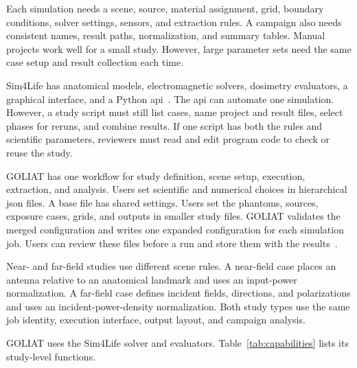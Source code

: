 \documentclass[final,5p,times,twocolumn]{elsarticle}
\begin{document}
Each simulation needs a scene, source, material assignment, grid, boundary conditions, solver settings, sensors, and extraction rules. A campaign also needs consistent names, result paths, normalization, and summary tables. Manual projects work well for a small study. However, large parameter sets need the same case setup and result collection each time.

Sim4Life has anatomical models, electromagnetic solvers, dosimetry evaluators, a graphical interface, and a Python \gls{api}~\cite{Gosselin2014,Sim4Life}. The \gls{api} can automate one simulation. However, a study script must still list cases, name project and result files, select phases for reruns, and combine results. If one script has both the rules and scientific parameters, reviewers must read and edit program code to check or reuse the study.

GOLIAT has one workflow for study definition, scene setup, execution, extraction, and analysis. Users set scientific and numerical choices in hierarchical \gls{json} files. A base file has shared settings. Users set the phantoms, sources, exposure cases, grids, and outputs in smaller study files. GOLIAT validates the merged configuration and writes one expanded configuration for each simulation job. Users can review these files before a run and store them with the results~\cite{Sandve2013,Wilson2014}.

Near- and far-field studies use different scene rules. A near-field case places an antenna relative to an anatomical landmark and uses an input-power normalization. A far-field case defines incident fields, directions, and polarizations and uses an incident-power-density normalization. Both study types use the same job identity, execution interface, output layout, and campaign analysis.

GOLIAT uses the Sim4Life solver and evaluators. Table~\ref{tab:capabilities} lists its study-level functions.
\end{document}
